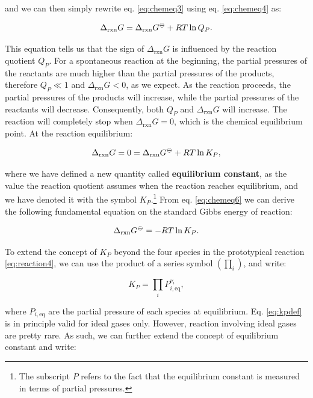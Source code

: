 \documentclass[
  9pt,
]{extbook}
\theoremstyle{definition}
\theoremstyle{definition}
\theoremstyle{definition}
\theoremstyle{definition}
\theoremstyle{remark}
\begin{document}
and we can then simply rewrite eq. \eqref{eq:chemeq3} using eq. \eqref{eq:chemeq4} as:

\begin{equation}
\Delta_{\text{rxn}} G = \Delta_{\text{rxn}} G^{-\kern-6pt{\ominus}\kern-6pt-}+ RT \ln Q_P.
\label{eq:chemeq5}
\end{equation}

This equation tells us that the sign of \(\Delta_{\text{rxn}} G\) is influenced by the reaction quotient \(Q_P\). For a spontaneous reaction at the beginning, the partial pressures of the reactants are much higher than the partial pressures of the products, therefore \(Q_P \ll 1\) and \(\Delta_{\text{rxn}} G < 0\), as we expect. As the reaction proceeds, the partial pressures of the products will increase, while the partial pressures of the reactants will decrease. Consequently, both \(Q_P\) and \(\Delta_{\text{rxn}} G\) will increase. The reaction will completely stop when \(\Delta_{\text{rxn}} G = 0\), which is the chemical equilibrium point. At the reaction equilibrium:

\begin{equation}
\Delta_{\text{rxn}} G = 0 = \Delta_{\text{rxn}} G^{-\kern-6pt{\ominus}\kern-6pt-}+ RT \ln K_P,
\label{eq:chemeq6}
\end{equation}

where we have defined a new quantity called \textbf{equilibrium constant}, as the value the reaction quotient assumes when the reaction reaches equilibrium, and we have denoted it with the symbol \(K_P\).\footnote{The subscript \(P\) refers to the fact that the equilibrium constant is measured in terms of partial pressures.} From eq. \eqref{eq:chemeq6} we can derive the following fundamental equation on the standard Gibbs energy of reaction:

\begin{equation}
\Delta_{\text{rxn}} G^{-\kern-6pt{\ominus}\kern-6pt-}= - RT \ln K_P.
\label{eq:chemeqdg0}
\end{equation}

To extend the concept of \(K_P\) beyond the four species in the prototypical reaction \eqref{eq:reaction4}, we can use the product of a series symbol \(\left( \prod_i \right)\), and write:

\begin{equation}
K_P=\prod_i P_{i,\text{eq}}^{\nu_i},
\label{eq:kpdef}
\end{equation}

where \(P_{i,\text{eq}}\) are the partial pressure of each species at equilibrium. Eq. \eqref{eq:kpdef} is in principle valid for ideal gases only. However, reaction involving ideal gases are pretty rare. As such, we can further extend the concept of equilibrium constant and write:
\end{document}

